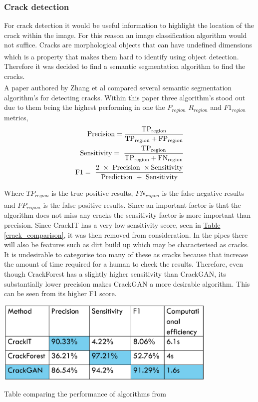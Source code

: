 \documentclass[11pt]{article}		%
\newcommand{\supercite}[1]{\textsuperscript{\cite{#1}}}		%
\newcommand{\tableref}[1]{\hyperref[#1]{Table \ref*{#1}}}     %
\begin{document}
		\subsubsection{Crack detection}
		
			For crack detection it would be useful information to highlight the location of the crack within the image.
			For this reason an image classification algorithm would not suffice. 
			Cracks are morphological objects that can have undefined dimensions which is a property that makes them hard to identify using object detection.\supercite{morphological}
			Therefore it was decided to find a semantic segmentation algorithm to find the cracks.
			\\
	        A paper authored by Zhang et al\supercite{CrackGAN1} compared several semantic segmentation algorithm’s for detecting cracks. 
	        Within this paper three algorithm’s stood out due to them being the highest performing in one the $P_{region}$  $R_{region}$ and $F1_{region}$ metrics,
	        \begin{align}
	        	\rm Precision = \frac{{\rm TP}_{region}}{{\rm TP}_{region}+{\rm FP}_{region}}
	        	\\
	        	\rm Sensitivity=\ \frac{{\rm TP}_{region}}{{\rm TP}_{region}+{\rm FN}_{region}}
	        	\\
	        	\rm F1=\ \frac{2\ \times\ \rm Precision\ \times \rm Sensitivity}{\rm Prediction\ +\ \rm Sensitivity}
	        \end{align}
	    
	       Where $TP_{region}$ is the true positive results, $FN_{region}$ is the false negative results and $FP_{region}$ is the false positive results.\supercite{CrackGAN1} Since an important factor is that the algorithm does not miss any cracks the sensitivity factor is more important than precision. 
	        Since CrackIT has a very low sensitivity score, seen in \tableref{crack_comparison}, it was then removed from consideration. 
	        In the pipes there will also be features such as dirt build up which may be characterised as cracks. 
	        It is undesirable to categorise too many of these as cracks because that increase the amount of time required for a human to check the results.
	        Therefore, even though CrackForest has a slightly higher sensitivity than CrackGAN, its substantially lower precision makes CrackGAN a more desirable algorithm. 
	        This can be seen from its higher F1 score.
        	
        	\begin{table}[h]
				\centering
				\includegraphics[width=0.8\textwidth]{CrackGAN_comparisonv1}
				\caption{Table comparing the performance of algorithms from \cite{CrackGAN1}}
				\label{crack_comparison}
			\end{table}
        
\end{document}
